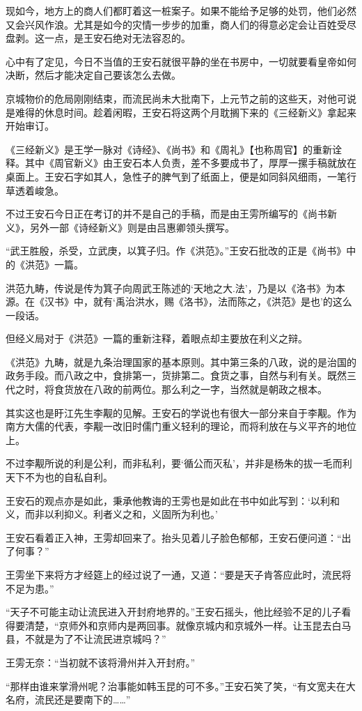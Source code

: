 现如今，地方上的商人们都盯着这一桩案子。如果不能给予足够的处罚，他们必然又会兴风作浪。尤其是如今的灾情一步步的加重，商人们的得意必定会让百姓受尽盘剥。这一点，是王安石绝对无法容忍的。

心中有了定见，今日不当值的王安石就很平静的坐在书房中，一切就要看皇帝如何决断，然后才能决定自己要该怎么去做。

京城物价的危局刚刚结束，而流民尚未大批南下，上元节之前的这些天，对他可说是难得的休息时间。趁着闲暇，王安石将这两个月耽搁下来的《三经新义》拿起来开始审订。

《三经新义》是王学一脉对《诗经》、《尚书》和《周礼》【也称周官】的重新诠释。其中《周官新义》由王安石本人负责，差不多要成书了，厚厚一摞手稿就放在桌面上。王安石字如其人，急性子的脾气到了纸面上，便是如同斜风细雨，一笔行草透着峻急。

不过王安石今日正在考订的并不是自己的手稿，而是由王雱所编写的《尚书新义》，另外一部《诗经新义》则是由吕惠卿领头撰写。

“武王胜殷，杀受，立武庚，以箕子归。作《洪范》。”王安石批改的正是《尚书》中的《洪范》一篇。

洪范九畴，传说是传为箕子向周武王陈述的‘天地之大.法’，乃是以《洛书》为本源。在《汉书》中，就有‘禹治洪水，赐《洛书》，法而陈之，《洪范》是也’的这么一段话。

但经义局对于《洪范》一篇的重新注释，着眼点却主要放在利义之辩。

《洪范》九畴，就是九条治理国家的基本原则。其中第三条的八政，说的是治国的政务手段。而八政之中，食排第一，货排第二。食货之事，自然与利有关。既然三代之时，将食货放在八政的前两位。那么利之一字，当然就是朝政之根本。

其实这也是盱江先生李觏的见解。王安石的学说也有很大一部分来自于李觏。作为南方大儒的代表，李觏一改旧时儒门重义轻利的理论，而将利放在与义平齐的地位上。

不过李觏所说的利是公利，而非私利，要‘循公而灭私’，并非是杨朱的拔一毛而利天下不为也的自私自利。

王安石的观点亦是如此，秉承他教诲的王雱也是如此在书中如此写到：‘以利和义，而非以利抑义。利者义之和，义固所为利也。’

王安石看着正入神，王雱却回来了。抬头见着儿子脸色郁郁，王安石便问道：“出了何事？”

王雱坐下来将方才经筵上的经过说了一通，又道：“要是天子肯答应此时，流民将不足为患。”

“天子不可能主动让流民进入开封府地界的。”王安石摇头，他比经验不足的儿子看得要清楚，“京师外和京师内是两回事。就像京城内和京城外一样。让玉昆去白马县，不就是为了不让流民进京城吗？”

王雱无奈：“当初就不该将滑州并入开封府。”

“那样由谁来掌滑州呢？治事能如韩玉昆的可不多。”王安石笑了笑，“有文宽夫在大名府，流民还是要南下的……”


